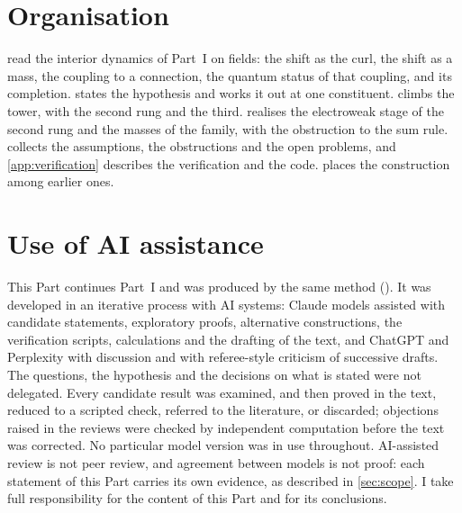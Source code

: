 \section{Organisation}

 read the interior dynamics of Part~I on fields: the shift as the curl, the shift
as a mass, the coupling to a connection, the quantum status of that coupling, and its completion.  states the hypothesis and
works it out at one constituent.  climbs the tower, with the second rung and the third.  realises the electroweak
stage of the second rung and the masses of the family, with the obstruction to the sum rule.  collects the assumptions,
the obstructions and the open problems, and \cref{app:verification} describes the verification and the code.  places the
construction among earlier ones.

\section{Use of AI assistance}
\label{sec:ai}

This Part continues Part~I and was produced by the same method (). It was developed in an iterative process
with AI systems: Claude models assisted with candidate statements, exploratory proofs, alternative constructions, the verification scripts,
calculations and the drafting of the text, and ChatGPT and Perplexity with discussion and with referee-style criticism of successive drafts. The questions,
the hypothesis and the decisions on what is stated were not delegated. Every candidate result was examined, and then proved in the text,
reduced to a scripted check, referred to the literature, or discarded; objections raised in the reviews were checked by independent
computation before the text was corrected. No particular model version was in use throughout. AI-assisted review is not peer review, and
agreement between models is not proof: each statement of this Part carries its own evidence, as described in \cref{sec:scope}. I take full
responsibility for the content of this Part and for its conclusions.
